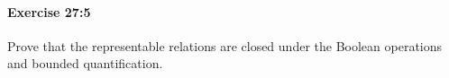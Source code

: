 \documentclass[a4paper,11pt]{article}
\begin{document}
\begin{description}
\end{description}

\paragraph{Exercise 27:5}

Prove that the representable relations are closed under the Boolean operations and bounded quantification.
\end{document}
